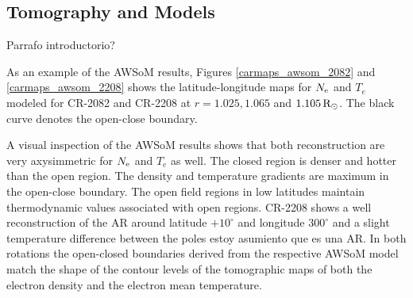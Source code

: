 \documentclass[namedreferences]{solarphysics}
\newcommand{\mdeg}{^\circ}
\newcommand{\mrsun}{{\rm R_\odot}}
\newcommand{\Ne}{N_{\rm e}}
\def\temp#1{\textcolor{mygray}{#1}}
\begin{document}
\begin{article}
\subsection{Tomography and Models}\label{awsom_res} 

\temp{Parrafo introductorio?}


As an example of the AWSoM results, Figures \ref{carmaps_awsom_2082} and \ref{carmaps_awsom_2208} shows the latitude-longitude maps for $\Ne$ and $T_e$ modeled for CR-2082 and CR-2208 at $r=1.025, 1.065$ and $1.105\,\mrsun$. The black curve denotes the open-close boundary.



A visual inspection of the AWSoM results shows that both reconstruction are very axysimmetric for $\Ne$ and $T_e$ as well. The closed region is denser and hotter than the open region. The density and temperature gradients are maximum in the open-close boundary. The open field regions in low latitudes maintain thermodynamic values associated with open regions. CR-2208 shows a well reconstruction of the AR around latitude $+10\mdeg$ and longitude $300\mdeg$ and a slight temperature difference between the poles \temp{estoy asumiento que es una AR}. 
In both rotations the open-closed boundaries derived from the respective AWSoM model match the shape of the contour levels of the tomographic maps of both the electron density and the electron mean temperature.



\end{article}
\end{document}
